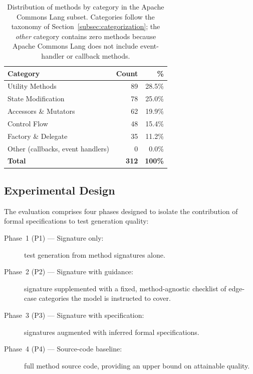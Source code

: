 \begin{table}[ht]
\centering
\caption{Distribution of methods by category in the Apache Commons Lang subset. Categories follow the taxonomy of Section~\ref{subsec:categorization}; the \emph{other} category contains zero methods because Apache Commons Lang does not include event-handler or callback methods.}
\label{tab:method-distribution}
\begin{tabular}{lrr}
\toprule
\textbf{Category} & \textbf{Count} & \textbf{\%} \\
\midrule
Utility Methods & 89 & 28.5\% \\
State Modification & 78 & 25.0\% \\
Accessors \& Mutators & 62 & 19.9\% \\
Control Flow & 48 & 15.4\% \\
Factory \& Delegate & 35 & 11.2\% \\
Other (callbacks, event handlers) & 0 & 0.0\% \\
\midrule
\textbf{Total} & \textbf{312} & \textbf{100\%} \\
\bottomrule
\end{tabular}
\end{table}

\subsection{Experimental Design}

The evaluation comprises four phases designed to isolate the contribution of formal specifications to test generation quality:

\begin{description}
    \item[Phase~1 (P1) --- Signature only:] test generation from method signatures alone.
    \item[Phase~2 (P2) --- Signature with guidance:] signature supplemented with a fixed, method-agnostic checklist of edge-case categories the model is instructed to cover.
    \item[Phase~3 (P3) --- Signature with specification:] signatures augmented with inferred formal specifications.
    \item[Phase~4 (P4) --- Source-code baseline:] full method source code, providing an upper bound on attainable quality.
\end{description}

